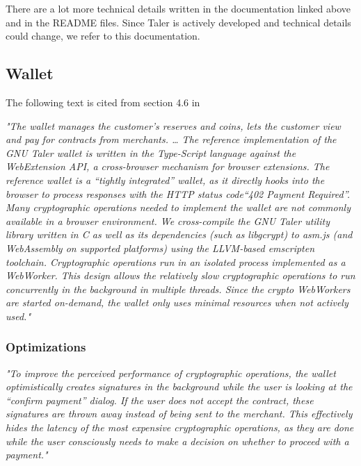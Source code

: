 There are a lot more technical details written in the documentation linked above and in the README files.
Since Taler is actively developed and technical details could change, we refer to this documentation.

\subsection{Wallet}
The following text is cited from section 4.6 in \cite{dold:the-gnu-taler-system}
\begin{center}
    \textit{
        "The wallet manages the customer’s reserves and coins, lets the customer view and pay for contracts from merchants. \dots
        The reference implementation of the GNU Taler wallet is written in the Type-Script language against the WebExtension API, a cross-browser mechanism for browser extensions.
        The reference wallet is a “tightly integrated” wallet, as it directly hooks into the browser to process responses with the HTTP status code“402 Payment Required”.\\
        Many cryptographic operations needed to implement the wallet are not commonly available in a browser environment.
        We cross-compile the GNU Taler utility library written in C as well as its dependencies (such as libgcrypt) to asm.js (and WebAssembly on supported platforms) using the LLVM-based emscripten toolchain.
        Cryptographic operations run in an isolated process implemented as a WebWorker.
        This design allows the relatively slow cryptographic operations to run concurrently in the background in multiple threads.
        Since the crypto WebWorkers are started on-demand, the wallet only uses minimal resources when not actively used."
    }
\end{center}

\subsubsection{Optimizations}
\begin{center}
    \textit{
        "To improve the perceived performance of cryptographic operations, the wallet optimistically creates signatures in the background while the user is looking at the “confirm payment” dialog.
        If the user does not accept the contract, these signatures are thrown away instead of being sent to the merchant.
        This effectively hides the latency of the most expensive cryptographic operations, as they are done while the user consciously needs to make a decision on whether to proceed with a payment."
    }
\end{center}

